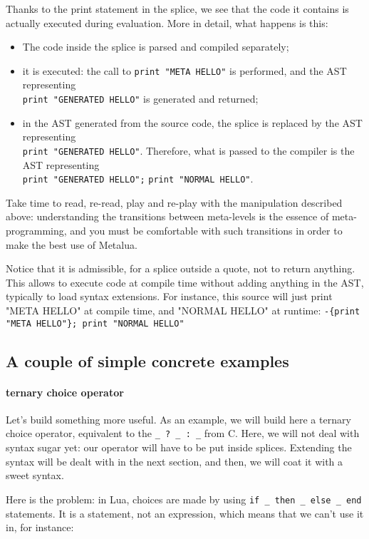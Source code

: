 Thanks to the print statement in the splice, we see that the code
it contains is actually executed during evaluation. More in detail,
what happens is this:
\begin{itemize}
\item The code inside the splice is parsed and compiled separately;
\item it is executed: the call to \verb|print "META HELLO"| is
  performed, and the AST representing \\ \verb|print "GENERATED HELLO"| is
  generated and returned;
\item in the AST generated from the source code, the splice is
  replaced by the AST representing \\ \verb|print "GENERATED HELLO"|.
  Therefore, what is passed to the compiler is the AST representing\\
  \verb|print "GENERATED HELLO";| \verb|print "NORMAL HELLO"|.
\end{itemize}

Take time to read, re-read, play and re-play with the manipulation
described above: understanding the transitions between meta-levels is
the essence of meta-programming, and you must be comfortable with such
transitions in order to make the best use of Metalua.

Notice that it is admissible, for a splice outside a quote, not to
return anything. This allows to execute code at compile time without
adding anything in the AST, typically to load syntax extensions. For
instance, this source will just print "META HELLO" at compile time,
and "NORMAL HELLO" at runtime:
\verb|-{print "META HELLO"}; print "NORMAL HELLO"|

\subsection{A couple of simple concrete examples}

\paragraph{ternary choice operator}
Let's build something more useful. As an example, we will build here a
ternary choice operator, equivalent to the \verb|_ ? _ : _| from
C. Here, we will not deal with syntax sugar yet: our operator will
have to be put inside splices. Extending the syntax will be dealt with
in the next section, and then, we will coat it with a sweet syntax.

Here is the problem: in Lua, choices are made by using
\verb|if _ then _ else _ end| statements. It is a statement, not an
expression, which means that we can't use it in, for instance:

